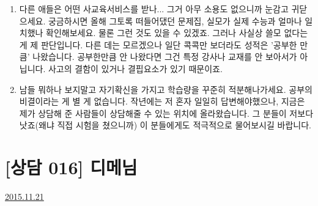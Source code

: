 \begin{enumerate}
    \item 다른 애들은 어떤 사교육서비스를 받나... 그거 아무 소용도 없으니까 눈감고 귀닫으세요.
    궁금하시면 올해 그토록 떠들어댔던 문제집, 실모가 실제 수능과 얼마나 일치했나 확인해보세요.
    물론 그런 것도 있을 수 있겠죠. 그러나 사실상 쓸모 없다는 게 제 판단입니다.
    다른 데는 모르겠으나 일단 콕콕만 보더라도 성적은 '공부한 만큼' 나왔습니다.
    공부한만큼 안 나왔다면 그건 특정 강사나 교재를 안 보아서가 아닙니다. 사고의 결함이 있거나 결핍요소가 있기 때문이죠.
    \vspace{5mm}
    
    \item 남들 뭐하나 보지말고 자기확신을 가지고 학습량을 꾸준히 적분해나가세요.
    공부의 비결이라는 게 별 게 없습니다.
    작년에는 저 혼자 일일히 답변해야했으나, 지금은 제가 상담해 준 사람들이 상담해줄 수 있는 위치에 올라왔습니다.
    그 분들이 저보다 낫죠(왜냐 직접 시험을 쳤으니까) 이 분들에게도 적극적으로 물어보시길 바랍니다.
    \vspace{5mm}
\end{enumerate}





\section{[상담 016] 디메님}
\href{https://www.kockoc.com/Apoc/504241}{2015.11.21}

\vspace{5mm}


